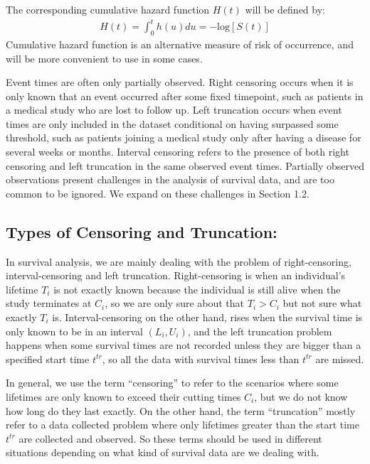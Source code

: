 \documentclass[]{article}
\begin{document}
The corresponding cumulative hazard function \(H(t)\) will be defined
by: \begin{equation}\begin{aligned}\label{eqn:chazard}
H(t) = \int_{0}^{t} h(u) du = -\text{log}[S(t)]
\end{aligned}\end{equation} Cumulative hazard function is an alternative
measure of risk of occurrence, and will be more convenient to use in
some cases.

Event times are often only partially observed. Right censoring occurs
when it is only known that an event occurred after some fixed timepoint,
such as patients in a medical study who are lost to follow up. Left
truncation occurs when event times are only included in the dataset
conditional on having surpassed some threshold, such as patients joining
a medical study only after having a disease for several weeks or months.
Interval censoring refers to the presence of both right censoring and
left truncation in the same observed event times. Partially observed
observations present challenges in the analysis of survival data, and
are too common to be ignored. We expand on these challenges in Section
1.2.

\hypertarget{types-of-censoring-and-truncation}{%
\subsection{Types of Censoring and
Truncation:}\label{types-of-censoring-and-truncation}}

In survival analysis, we are mainly dealing with the problem of
right-censoring, interval-censoring and left truncation. Right-censoring
is when an individual's lifetime \(T_i\) is not exactly known because
the individual is still alive when the study terminates at \(C_i\), so
we are only sure about that \(T_i > C_i\) but not sure what exactly
\(T_i\) is. Interval-censoring on the other hand, rises when the
survival time is only known to be in an interval \((L_i,U_i)\), and the
left truncation problem happens when some survival times are not
recorded unless they are bigger than a specified start time \(t^{tr}\),
so all the data with survival times less than \(t^{tr}\) are missed.

In general, we use the term ``censoring'' to refer to the scenarios
where some lifetimes are only known to exceed their cutting times
\(C_i\), but we do not know how long do they last exactly. On the other
hand, the term ``truncation'' mostly refer to a data collected problem
where only lifetimes greater than the start time \(t^{tr}\) are
collected and observed. So these terms should be used in different
situations depending on what kind of survival data are we dealing with.
\end{document}
